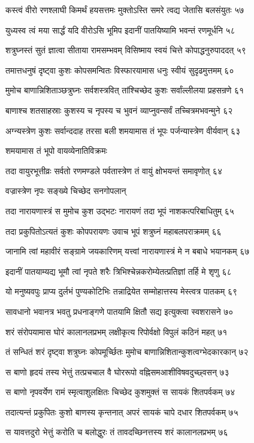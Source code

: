 कस्त्वं वीरो रणश्लाघी किमर्थं हयसत्तमः
मुक्तोऽस्ति समरे त्वद्य जेतासि बलसंयुतः ५७

युध्यस्व त्वं मया सार्द्धं यदि वीरोऽसि भूमिप
इदानीं पातयिष्यामि भवन्तं रणमूर्धनि ५८

शत्रुघ्नस्तं सुतं ज्ञात्वा सीताया रामसम्भवम्
विसिष्माय स्वयं चित्ते कोपाद्धनुरुपाददत् ५९

तमात्तधनुषं दृष्ट्वा कुशः कोपसमन्वितः
विस्फारयामास धनुः स्वीयं सुदृढमुत्तमम् ६०

मुमोच बाणान्निशिताञ्छत्रुघ्नः सर्वशस्त्रवित्
तांश्चिच्छेद कुशः सर्वांल्लीलया प्रहसन्रणे ६१

बाणाश्च शतसाहस्राः कुशस्य च नृपस्य च
भुवनं व्याप्नुवन्सर्वं तच्चित्रमभवन्मुने ६२

अग्न्यस्त्रेण कुशः सर्वान्ददाह तरसा बली
शमयामास तं भूपः पर्जन्यास्त्रेण वीर्यवान् ६३

शमयामास तं भूपो वायव्येनातिविक्रमः

तदा वायुरभूत्तीव्रः सर्वतो रणमण्डले
पर्वतास्त्रेण तं वायुं क्षोभयन्तं समावृणोत् ६४

वज्रास्त्रेण नृपः सङ्ख्ये चिच्छेद सनगोपलान्

तदा नारायणास्त्रं स मुमोच कुश उद्भटः
नारायणं तदा भूपं नाशकत्परिबाधितुम् ६५

तदा प्रकुपितोऽत्यतं कुशः कोपपरायणः
उवाच भूपं शत्रुघ्नं महाबलपराक्रमम् ६६

जानामि त्वां महावीरं सङ्ग्रामे जयकारिणम्
यत्त्वां नारायणास्त्रं मे न बबाधे भयानकम् ६७

इदानीं पातयाम्यद्य भूमौ त्वां नृपते शरैः
त्रिभिश्चेन्नकरोम्येतत्प्रतिज्ञां तर्हि मे शृणु ६८

यो मनुष्यवपुः प्राप्य दुर्लभं पुण्यकोटिभिः
तन्नाद्रियेत सम्मोहात्तस्य मेस्त्वत्र पातकम् ६९

सावधानो भवानत्र भवतु प्रधनाङ्गणे
पातयामि क्षितौ सद्य इत्युक्त्वा स्वशरासने ७०

शरं संरोपयामास घोरं कालानलप्रभम्
लक्षीकृत्य रिपोर्वक्षो विपुलं कठिनं महत् ७१

तं सन्धितं शरं दृष्ट्वा शत्रुघ्नः कोपमूर्च्छितः
मुमोच बाणान्निशितान्कुशत्वग्भेदकारकान् ७२

स बाणो हृदयं तस्य भेत्तुं तत्प्रचचाल वै
घोररूपो वह्निसमआशीविषवदुच्छ्वसन् ७३

स बाणो नृपवर्येण रामं स्मृत्वाशुलक्षितः
चिच्छेद कुशमुक्तं स सायकं शितपर्वकम् ७४

तदात्यन्तं प्रकुपितः कुशो बाणस्य कृन्तनात्
अपरं सायकं चापे दधार शितपर्वकम् ७५

स यावत्तदुरो भेत्तुं करोति च बलोद्धुरः
तं तावदच्छिनत्तस्य शरं कालानलप्रभम् ७६

